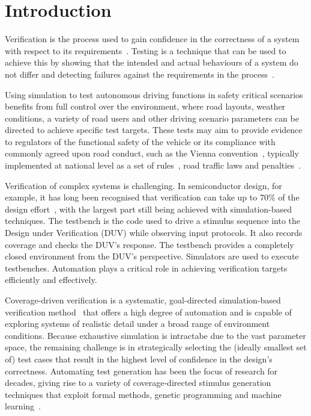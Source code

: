 \documentclass[runningheads,a4paper]{llncs}
\begin{document}
\section{Introduction} \label{s:introduction}

Verification is the process used to gain confidence in the correctness of a system with respect to its requirements~\cite{bergeron2012writing}. Testing is a technique that can be used to achieve this by showing that the intended and actual behaviours of a system do not differ and detecting failures against the requirements in the process~\cite{utting2012taxonomy}.

Using simulation to test autonomous driving functions in safety critical scenarios benefits from full control over the environment, where road layouts, weather conditions, a variety of road users and other driving scenario parameters can be directed to achieve specific test targets. These tests may aim to provide evidence to regulators of the functional safety of the vehicle or its compliance with commonly agreed upon road conduct, such as the Vienna convention~\cite{ViennaConv}, typically implemented at national level as a set of rules~\cite{codes2015highway}, road traffic laws and penalties~\cite{RoadTraffic1988}.

Verification of complex systems is challenging. In semiconductor design, for example, it has long been recognised that verification can take up to 70\% of the design effort~\cite{arden2002international}, with the largest part still being achieved with simulation-based techniques. The testbench is the code used to drive a stimulus sequence into the Design under Verification (DUV) while observing input protocols. It also records coverage and checks the DUV's response. The testbench provides a completely closed environment from the DUV's perspective. Simulators are used to execute testbenches. Automation plays a critical role in achieving verification targets efficiently and effectively.

Coverage-driven verification is a systematic, goal-directed simulation-based verification method~\cite{HVC2015} that offers a high degree of automation and is capable of exploring systems of realistic detail under a broad range of environment conditions. Because exhaustive simulation is intractabe due to the vast parameter space, the remaining challenge is in strategically selecting the (ideally smallest set of) test cases that result in the highest level of confidence in the design's correctness. Automating test generation has been the focus of research for decades, giving rise to a variety of coverage-directed stimulus generation techniques that exploit formal methods, genetic programming and machine learning~\cite{Ioannides:2012}. 
\end{document}
